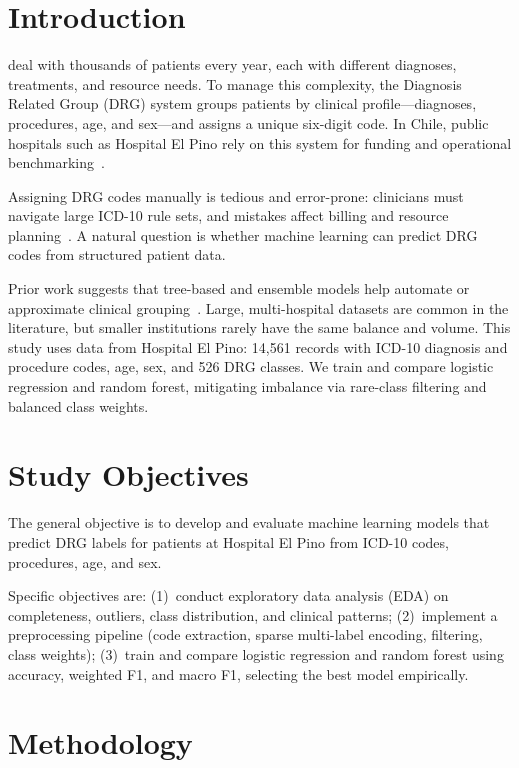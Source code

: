 \documentclass{ieeeaccess}
\begin{document}
\section{Introduction}
\label{sec:intro}
 deal with thousands of patients every year, each with different diagnoses, treatments, and resource needs. To manage this complexity, the Diagnosis Related Group (DRG) system groups patients by clinical profile---diagnoses, procedures, age, and sex---and assigns a unique six-digit code. In Chile, public hospitals such as Hospital El Pino rely on this system for funding and operational benchmarking~\cite{who_icd10,averill_drg}.

Assigning DRG codes manually is tedious and error-prone: clinicians must navigate large ICD-10 rule sets, and mistakes affect billing and resource planning~\cite{averill_drg}. A natural question is whether machine learning can predict DRG codes from structured patient data.

Prior work suggests that tree-based and ensemble models help automate or approximate clinical grouping~\cite{goldfield2008,xie2018,mullenbach2018}. Large, multi-hospital datasets are common in the literature, but smaller institutions rarely have the same balance and volume. This study uses data from Hospital El Pino: 14{,}561 records with ICD-10 diagnosis and procedure codes, age, sex, and 526 DRG classes. We train and compare logistic regression and random forest, mitigating imbalance via rare-class filtering and balanced class weights.

\section{Study Objectives}
\label{sec:objectives}
The general objective is to develop and evaluate machine learning models that predict DRG labels for patients at Hospital El Pino from ICD-10 codes, procedures, age, and sex.

Specific objectives are: (1)~conduct exploratory data analysis (EDA) on completeness, outliers, class distribution, and clinical patterns; (2)~implement a preprocessing pipeline (code extraction, sparse multi-label encoding, filtering, class weights); (3)~train and compare logistic regression and random forest using accuracy, weighted F1, and macro F1, selecting the best model empirically.

\section{Methodology}
\label{sec:method}
\end{document}
